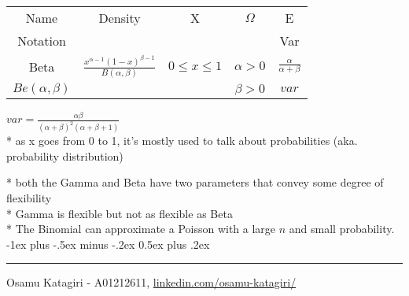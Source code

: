 \documentclass[10pt,landscape]{article}
\makeatletter
\renewcommand{\section}{\@startsection{section}{1}{0mm}%
                                {-1ex plus -.5ex minus -.2ex}%
                                {0.5ex plus .2ex}%
                                {\normalfont\large\bfseries}}
\makeatother
\begin{document}
\begin{multicols}{3}
\begin{center}
\begin{tabular}{ |ccccc| }
\hline
Name & Density & X & $\Omega$ & E \\
Notation &  &  &  & Var \\
\hline
Beta & $\frac{x^{\alpha - 1} (1 - x)^{\beta - 1}}{B(\alpha,\beta)}$ & $0 \leq x \leq 1$ & $\alpha > 0$ & $\frac{\alpha}{\alpha + \beta}$ \\
$Be(\alpha,\beta)$ &  &  & $\beta > 0$ & $var$ \\
\end{tabular}
\end{center}
$var = \frac{\alpha \beta}{(\alpha + \beta)^2 (\alpha + \beta + 1)}$ \\
* as x goes from 0 to 1, it's mostly used to talk about probabilities (aka. probability distribution)

\medskip
* both the Gamma and Beta have two parameters that convey some degree of flexibility \\
* Gamma is flexible but not as flexible as Beta \\
* The Binomial can approximate a Poisson with a large $n$ and small probability. \\

\section{} %
\hrule
Osamu Katagiri - A01212611, \href{https://www.linkedin.com/in/osamu-katagiri-84b2b940/}{linkedin.com/osamu-katagiri/}
\end{multicols}
\end{document}

